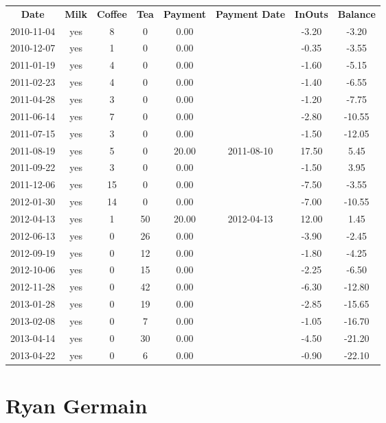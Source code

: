 \begin{center}
\begin{tabular}{cccccccc}
\textbf{Date} & \textbf{Milk} & \textbf{Coffee} & \textbf{Tea} & \textbf{Payment} & \textbf{Payment Date} & \textbf{InOuts} & \textbf{Balance} \\
2010-11-04 & yes &  8 &  0 &  0.00 &  & -3.20 &  -3.20\\ 
2010-12-07 & yes &  1 &  0 &  0.00 &  & -0.35 &  -3.55\\ 
2011-01-19 & yes &  4 &  0 &  0.00 &  & -1.60 &  -5.15\\ 
2011-02-23 & yes &  4 &  0 &  0.00 &  & -1.40 &  -6.55\\ 
2011-04-28 & yes &  3 &  0 &  0.00 &  & -1.20 &  -7.75\\ 
2011-06-14 & yes &  7 &  0 &  0.00 &  & -2.80 & -10.55\\ 
2011-07-15 & yes &  3 &  0 &  0.00 &  & -1.50 & -12.05\\ 
2011-08-19 & yes &  5 &  0 & 20.00 & 2011-08-10 & 17.50 &   5.45\\ 
2011-09-22 & yes &  3 &  0 &  0.00 &  & -1.50 &   3.95\\ 
2011-12-06 & yes & 15 &  0 &  0.00 &  & -7.50 &  -3.55\\ 
2012-01-30 & yes & 14 &  0 &  0.00 &  & -7.00 & -10.55\\ 
2012-04-13 & yes &  1 & 50 & 20.00 & 2012-04-13 & 12.00 &   1.45\\ 
2012-06-13 & yes &  0 & 26 &  0.00 &  & -3.90 &  -2.45\\ 
2012-09-19 & yes &  0 & 12 &  0.00 &  & -1.80 &  -4.25\\ 
2012-10-06 & yes &  0 & 15 &  0.00 &  & -2.25 &  -6.50\\ 
2012-11-28 & yes &  0 & 42 &  0.00 &  & -6.30 & -12.80\\ 
2013-01-28 & yes &  0 & 19 &  0.00 &  & -2.85 & -15.65\\ 
2013-02-08 & yes &  0 &  7 &  0.00 &  & -1.05 & -16.70\\ 
2013-04-14 & yes &  0 & 30 &  0.00 &  & -4.50 & -21.20\\ 
2013-04-22 & yes &  0 &  6 &  0.00 &  & -0.90 & -22.10
\end{tabular}
\end{center}

\section{Ryan Germain}

